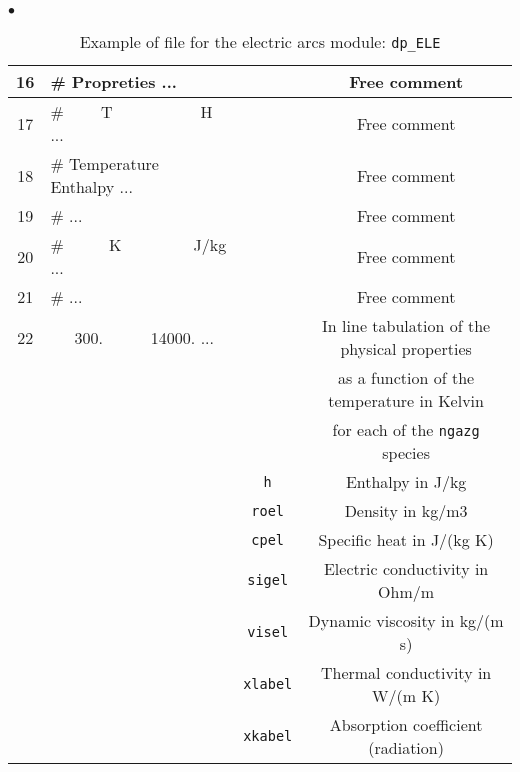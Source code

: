 {{{\begin{list}{$\bullet$}{}
\begin{table}[htbp]
\begin{center}
{\begin{tabular}{|c|l|c|c|}
 16     &\#  Propreties                ... &           & Free comment                                       \\ \hline
 17     &\#  ~~~~T~~~~~~~~~~~H         ... &           & Free comment                                       \\ \hline
 18     &\#  Temperature  Enthalpy    ... &           & Free comment                                       \\ \hline
 19     &\#                            ... &           & Free comment                                       \\ \hline
 20     &\#  ~~~~~K~~~~~~~~~J/kg       ... &           & Free comment                                       \\ \hline
 21     &\#                            ... &           & Free comment                                       \\ \hline
 22     &    ~~~300.~~~~~~14000.       ... &           & In line tabulation of the physical properties      \\
        &                                  &           & as a function of the temperature in Kelvin         \\
        &                                  &           & for each of the \texttt{ngazg} species             \\
        &                    &    \texttt{h}                    & Enthalpy in J/kg                                   \\
        &                    &    \texttt{roel}                 & Density in kg/m3                                   \\
        &                    &    \texttt{cpel}                 & Specific heat in J/(kg K)                          \\
        &                    &    \texttt{sigel}                & Electric conductivity in Ohm/m                     \\
        &                    &    \texttt{visel}                & Dynamic viscosity in kg/(m s)                      \\
        &                    &    \texttt{xlabel}               & Thermal conductivity in W/(m K)                    \\
        &                    &    \texttt{xkabel\index{xkabel}} & Absorption coefficient (radiation)                 \\   \hline
\end{tabular}
}
\caption{Example of file for the electric arcs module:
 \texttt{dp\_ELE}}\label{tab:dpELE}
\end{center}
\end{table}


\end{list}}}}
